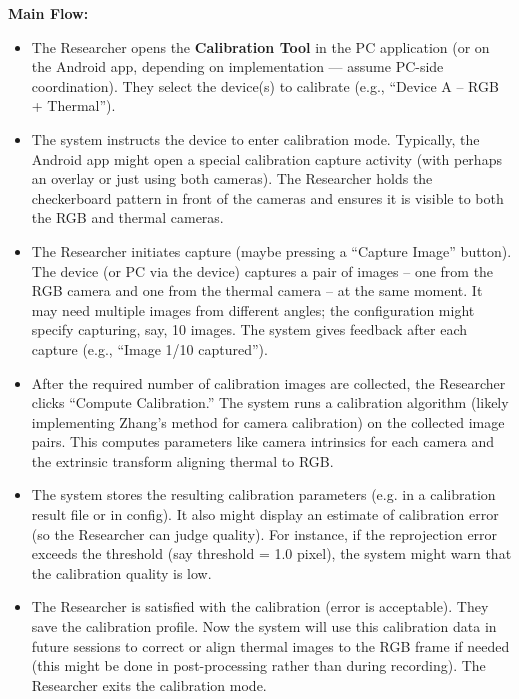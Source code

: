 \textbf{Main Flow:}
\begin{itemize}
  \item The Researcher opens the \textbf{Calibration Tool} in the PC application (or on the Android app, depending on implementation --- assume PC-side coordination). They select the device(s) to calibrate (e.g., ``Device A -- RGB + Thermal'').
  \item The system instructs the device to enter calibration mode. Typically, the Android app might open a special calibration capture activity (with perhaps an overlay or just using both cameras). The Researcher holds the checkerboard pattern in front of the cameras and ensures it is visible to both the RGB and thermal cameras.
  \item The Researcher initiates capture (maybe pressing a ``Capture Image'' button). The device (or PC via the device) captures a pair of images -- one from the RGB camera and one from the thermal camera -- at the same moment. It may need multiple images from different angles; the configuration might specify capturing, say, 10 images. The system gives feedback after each capture (e.g., ``Image 1/10 captured'').
  \item After the required number of calibration images are collected, the Researcher clicks ``Compute Calibration.'' The system runs a calibration algorithm (likely implementing Zhang's method for camera calibration) on the collected image pairs. This computes parameters like camera intrinsics for each camera and the extrinsic transform aligning thermal to RGB.
  \item The system stores the resulting calibration parameters (e.g. in a calibration result file or in config). It also might display an estimate of calibration error (so the Researcher can judge quality). For instance, if the reprojection error exceeds the threshold (say threshold = 1.0 pixel), the system might warn that the calibration quality is low.
  \item The Researcher is satisfied with the calibration (error is acceptable). They save the calibration profile. Now the system will use this calibration data in future sessions to correct or align thermal images to the RGB frame if needed (this might be done in post-processing rather than during recording). The Researcher exits the calibration mode.
\end{itemize}

